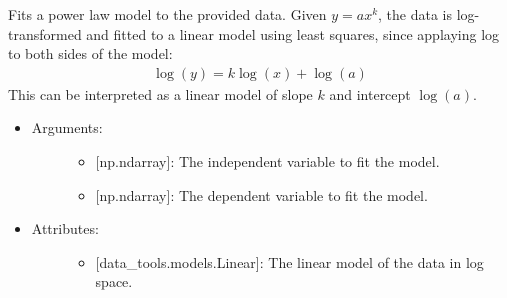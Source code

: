 \documentclass[letterpaper,10pt,english]{sphinxmanual}
\begin{document}
\begin{fulllineitems}
\begin{fulllineitems}
\begin{itemize}
\begin{description}
\begin{itemize}
\end{itemize}

\end{description}

\end{itemize}

\end{fulllineitems}


\end{fulllineitems}


\begin{fulllineitems}
\label{\detokenize{models:data_tools.models.PowerLaw}}
Fits a power law model to the provided data. Given \(y=ax^k\),
the data is log-transformed and fitted to a linear model using
least squares, since applaying log to both sides of the model:
\begin{equation*}
\begin{split}\log(y)=k\log(x)+\log(a)\end{split}
\end{equation*}
This can be interpreted as a linear model of slope \(k\) and
intercept \(\log(a)\).
\begin{itemize}
\item {} \begin{description}
\item[{Arguments:}] \leavevmode\begin{itemize}
\item {} 
 {[}np.ndarray{]}: The independent variable to fit the model.

\item {} 
 {[}np.ndarray{]}: The dependent variable to fit the model.

\end{itemize}

\end{description}

\item {} \begin{description}
\item[{Attributes:}] \leavevmode\begin{itemize}
\item {} 
 {[}data\_tools.models.Linear{]}: The linear model of the data
in log space.


\end{itemize}
\end{description}
\end{itemize}
\end{fulllineitems}
\end{document}
